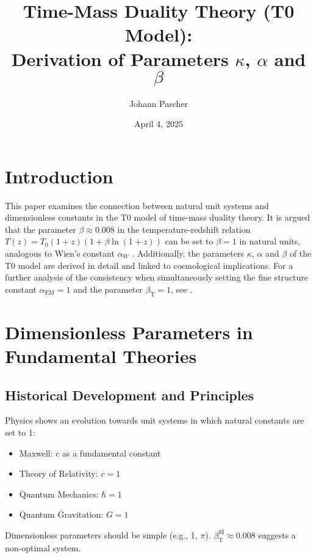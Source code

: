 \documentclass[12pt,a4paper]{article}
\newcommand{\alphaEM}{\alpha_{\text{EM}}}
\newcommand{\betaT}{\beta_{\text{T}}}
\begin{document}
	
	\title{Time-Mass Duality Theory (T0 Model): \\ Derivation of Parameters \(\kappa\), \(\alpha\) and \(\beta\)}
	\author{Johann Pascher}
	\date{April 4, 2025}
	
	\maketitle
	
	\section*{Introduction}
	
	This paper examines the connection between natural unit systems and dimensionless constants in the T0 model of time-mass duality theory. It is argued that the parameter \(\beta \approx 0.008\) in the temperature-redshift relation \(T(z) = T_0 (1+z)(1+\beta\ln(1+z))\) can be set to \(\beta = 1\) in natural units, analogous to Wien's constant \(\alpha_W\) \cite{pascher_temp_2025}. Additionally, the parameters \(\kappa\), \(\alpha\) and \(\beta\) of the T0 model are derived in detail and linked to cosmological implications. For a further analysis of the consistency when simultaneously setting the fine structure constant \(\alphaEM = 1\) and the parameter \(\betaT = 1\), see \cite{pascher_alphabeta_2025}.
	
	\tableofcontents
	\newpage
	
	\section{Dimensionless Parameters in Fundamental Theories}
	
	\subsection{Historical Development and Principles}
	
	Physics shows an evolution towards unit systems in which natural constants are set to 1:
	\begin{itemize}
		\item Maxwell: \(c\) as a fundamental constant
		\item Theory of Relativity: \(c = 1\)
		\item Quantum Mechanics: \(\hbar = 1\)
		\item Quantum Gravitation: \(G = 1\)
	\end{itemize}
	Dimensionless parameters should be simple (e.g., 1, \(\pi\)). \(\betaT^{\text{SI}} \approx 0.008\) suggests a non-optimal system.
	
\end{document}
